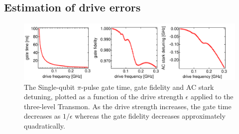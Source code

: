 \subsection{Estimation of drive errors}

\begin{figure}[htp!]
	\centering
	\includegraphics[width=\textwidth]{"./material/mathematica/three_level_driving_errors"}
	\caption[Single-qubit $\pi$-pulse gate time, gate fidelity and AC stark detuning as a function of drive strength]{The Single-qubit $\pi$-pulse gate time, gate fidelity and AC stark detuning, plotted as a function of the drive strength $\epsilon$ applied to the three-level Transmon. As the drive strength increases, the gate time decreases as $1/\epsilon$ whereas the gate fidelity decreases approximately quadratically.}
	\label{fig:three_level_driving_errors}
\end{figure}

